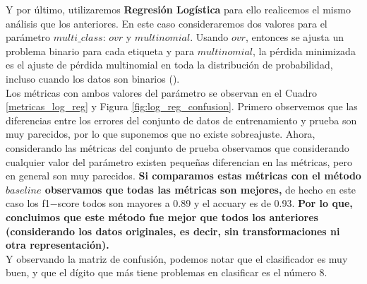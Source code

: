 \documentclass[paper=letter, fontsize=11pt]{scrartcl}
\numberwithin{equation}{section} %
\numberwithin{figure}{section} %
\numberwithin{table}{section} %
\begin{document}
Y por último, utilizaremos  \textbf{Regresión Logística} para ello realicemos el mismo análisis que los anteriores. En este caso consideraremos dos valores para el parámetro $multi\_class$: $ovr$ y $multinomial$. Usando $ovr$, entonces se ajusta un problema binario para cada etiqueta y para $multinomial$, la pérdida minimizada es el ajuste de pérdida multinomial en toda la distribución de probabilidad, incluso cuando los datos son binarios  (\cite{scikit-learn}). \\

Los métricas con ambos valores del parámetro se observan en el Cuadro \ref{metricas_log_reg} y Figura \ref{fig:log_reg_confusion}. Primero observemos que las diferencias entre los errores del conjunto de datos de entrenamiento y prueba son muy parecidos, por lo que suponemos que no existe sobreajuste. Ahora, considerando las métricas del conjunto de prueba observamos que considerando cualquier valor del parámetro existen pequeñas diferencian en las métricas, pero en general son muy parecidos. \textbf{Si comparamos estas métricas con el método $baseline$ observamos que todas las métricas son mejores,} de hecho en este caso los f1$-$score todos son mayores a 0.89 y el accuary es de 0.93. \textbf{Por lo que, concluimos que este método fue mejor que todos los anteriores (considerando los datos originales, es decir, sin transformaciones ni otra representación).}\\

Y observando la matriz de confusión, podemos notar que el clasificador es muy buen, y que el dígito que más tiene problemas en clasificar es el número 8.
\end{document}
